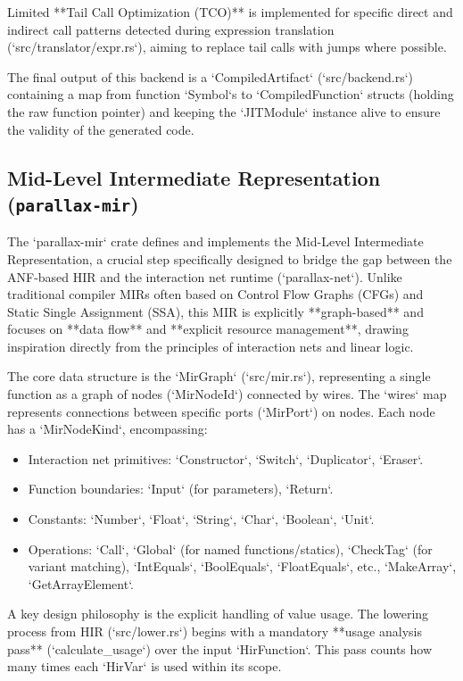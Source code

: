 Limited **Tail Call Optimization (TCO)** is implemented for specific direct and indirect call patterns detected during expression translation (`src/translator/expr.rs`), aiming to replace tail calls with jumps where possible.

The final output of this backend is a `CompiledArtifact` (`src/backend.rs`) containing a map from function `Symbol`s to `CompiledFunction` structs (holding the raw function pointer) and keeping the `JITModule` instance alive to ensure the validity of the generated code.

\subsection{Mid-Level Intermediate Representation (\texttt{parallax-mir})} %
The `parallax-mir` crate defines and implements the Mid-Level Intermediate Representation, a crucial step specifically designed to bridge the gap between the ANF-based HIR and the interaction net runtime (`parallax-net`). Unlike traditional compiler MIRs often based on Control Flow Graphs (CFGs) and Static Single Assignment (SSA), this MIR is explicitly **graph-based** and focuses on **data flow** and **explicit resource management**, drawing inspiration directly from the principles of interaction nets and linear logic.

The core data structure is the `MirGraph` (`src/mir.rs`), representing a single function as a graph of nodes (`MirNodeId`) connected by wires. The `wires` map represents connections between specific ports (`MirPort`) on nodes. Each node has a `MirNodeKind`, encompassing:
\begin{itemize}
    \item Interaction net primitives: `Constructor`, `Switch`, `Duplicator`, `Eraser`.
    \item Function boundaries: `Input` (for parameters), `Return`.
    \item Constants: `Number`, `Float`, `String`, `Char`, `Boolean`, `Unit`.
    \item Operations: `Call`, `Global` (for named functions/statics), `CheckTag` (for variant matching), `IntEquals`, `BoolEquals`, `FloatEquals`, etc., `MakeArray`, `GetArrayElement`.
\end{itemize}

A key design philosophy is the explicit handling of value usage. The lowering process from HIR (`src/lower.rs`) begins with a mandatory **usage analysis pass** (`calculate_usage`) over the input `HirFunction`. This pass counts how many times each `HirVar` is used within its scope.

